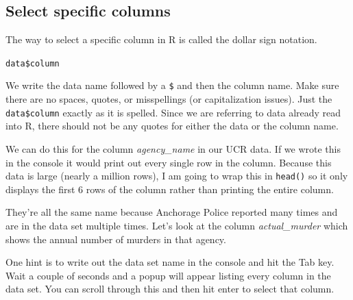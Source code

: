 \documentclass[
  12pt,
]{book}
\newenvironment{Shaded}{\begin{snugshade}}{\end{snugshade}}
\newcommand{\CommentTok}[1]{\textcolor[rgb]{0.37,0.37,0.37}{\textit{#1}}}
\newcommand{\DecValTok}[1]{\textcolor[rgb]{0.06,0.06,0.06}{#1}}
\newcommand{\KeywordTok}[1]{\textcolor[rgb]{0.27,0.27,0.27}{\textbf{#1}}}
\newcommand{\NormalTok}[1]{#1}
\newcommand{\OperatorTok}[1]{\textcolor[rgb]{0.43,0.43,0.43}{\textbf{#1}}}
\begin{document}
\hypertarget{select-specific-columns}{%
\subsection{Select specific columns}\label{select-specific-columns}}

The way to select a specific column in R is called the dollar sign notation.

\texttt{data\$column}

We write the data name followed by a \texttt{\$} and then the column name. Make sure there are no spaces, quotes, or misspellings (or capitalization issues). Just the \texttt{data\$column} exactly as it is spelled. Since we are referring to data already read into R, there should not be any quotes for either the data or the column name.

We can do this for the column \emph{agency\_name} in our UCR data. If we wrote this in the console it would print out every single row in the column. Because this data is large (nearly a million rows), I am going to wrap this in \texttt{head()} so it only displays the first 6 rows of the column rather than printing the entire column.

\begin{Shaded}
\end{Shaded}

They're all the same name because Anchorage Police reported many times and are in the data set multiple times. Let's look at the column \emph{actual\_murder} which shows the annual number of murders in that agency.

\begin{Shaded}
\end{Shaded}

One hint is to write out the data set name in the console and hit the Tab key. Wait a couple of seconds and a popup will appear listing every column in the data set. You can scroll through this and then hit enter to select that column.
\end{document}
